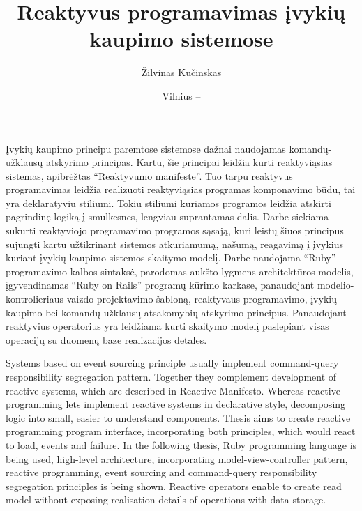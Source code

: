 \documentclass{VUMIFPSmagistrinis}
\title{Reaktyvus programavimas įvykių kaupimo sistemose}
\author{Žilvinas Kučinskas}
\date{Vilnius – \the\year}
\begin{document}
\maketitle



Įvykių kaupimo principu paremtose sistemose dažnai naudojamas komandų-užklausų atskyrimo principas. Kartu, šie principai leidžia kurti reaktyviąsias sistemas, apibrėžtas ``Reaktyvumo manifeste''. Tuo tarpu reaktyvus programavimas leidžia realizuoti reaktyviąsias programas komponavimo būdu, tai yra deklaratyviu stiliumi. Tokiu stiliumi kuriamos programos leidžia atskirti pagrindinę logiką į smulkesnes, lengviau suprantamas dalis. Darbe siekiama sukurti reaktyviojo programavimo programos sąsają, kuri leistų šiuos principus sujungti kartu užtikrinant sistemos atkuriamumą, našumą, reagavimą į įvykius kuriant įvykių kaupimo sistemos skaitymo modelį. Darbe naudojama ``Ruby'' programavimo kalbos sintaksė, parodomas aukšto lygmens architektūros modelis, įgyvendinamas ``Ruby on Rails'' programų kūrimo karkase, panaudojant modelio-kontrolieriaus-vaizdo projektavimo šabloną, reaktyvaus programavimo, įvykių kaupimo bei komandų-užklausų atsakomybių atskyrimo principus. Panaudojant reaktyvius operatorius yra leidžiama kurti skaitymo modelį paslepiant visas operacijų su duomenų baze realizacijos detales.



Systems based on event sourcing principle usually implement command-query responsibility segregation pattern. Together they complement development of reactive systems, which are described in Reactive Manifesto. Whereas reactive programming lets implement reactive systems in declarative style, decomposing logic into small, easier to understand components. Thesis aims to create reactive programming program interface, incorporating both principles, which would react to load, events and failure. In the following thesis, Ruby programming language is being used, high-level architecture, incorporating model-view-controller pattern, reactive programming, event sourcing and command-query responsibility segregation principles is being shown. Reactive operators enable to create read model without exposing realisation details of operations with data storage.
\end{document}
